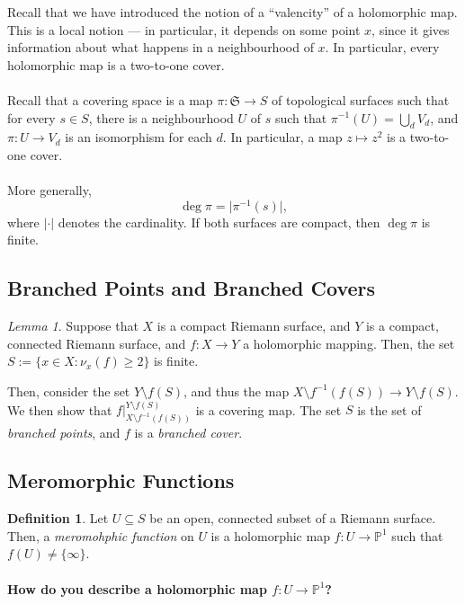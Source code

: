\documentclass[a4paper]{report}
\theoremstyle{definition}
\newtheorem{definition}{Definition}
\theoremstyle{remark}
\theoremstyle{proposition}
\theoremstyle{conjecture}
\theoremstyle{lemma}
\newtheorem{lemma}{Lemma}
\theoremstyle{corollary}
\theoremstyle{exercise}
\theoremstyle{example}
\begin{document}
Recall that we have introduced the notion of a ``valencity'' of a holomorphic 
map. This is a local notion --- in particular, it depends on some point $x$,
since it gives information about what happens in a neighbourhood of $x$. In 
particular, every holomorphic map is a two-to-one cover. \\\\
Recall that a covering space is a map $\pi : \mathfrak{S} \to S$ of topological 
surfaces such that for every $s \in S$, there is a neighbourhood $U$ of $s$
such that $\pi^{-1}(U) = \bigcup_d V_d$, and $\pi : U \to V_d$ is an isomorphism
for each $d$.
In particular, a map $z\mapsto z^2$ is a two-to-one cover.\\\\
More generally, $$\deg \pi = \vert \pi^{-1}(s)\vert,$$
where $\vert\cdot\vert$ denotes the cardinality. If both surfaces are compact,
then $\deg \pi$ is finite. 

\subsection{Branched Points and Branched Covers}
\begin{lemma}
    Suppose that $X$ is a compact Riemann surface, and $Y$ is a compact, connected
    Riemann surface, and $f : X \to Y$ a holomorphic mapping.
    Then, the set $S := \lbrace x \in X : \nu_x(f) \geq 2 \rbrace$ is finite.
\end{lemma}

Then, consider the set $Y\setminus f(S)$, and thus the map 
$X\setminus f^{-1}(f(S)) \to Y\setminus f(S)$. We then show that  
$f\vert^{Y\setminus f(S)}_{X\setminus f^{-1}(f(S))}$ is a covering map.
The set $S$ is the set of \emph{branched points}, and $f$ is a 
\emph{branched cover}.

\subsection{Meromorphic Functions}

\begin{definition}
    Let $U\subseteq S$ be an open, connected subset of a Riemann surface. 
    Then, a \emph{meromohphic function} on $U$ is a holomorphic
    map $f : U \to \mathbb{P}^1$ such that $f(U) \neq \lbrace \infty\rbrace$.
\end{definition}

\paragraph{How do you describe a holomorphic map $f : U \to \mathbb{P}^1$?} 
\end{document}
